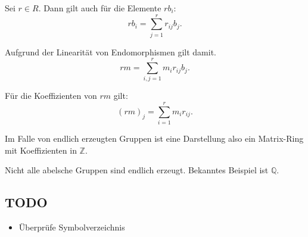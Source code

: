 \documentclass[a4paper]{amsart}
\theoremstyle{definition}
\newcommand{\Q}{\ensuremath{\mathbb{ Q }}}
\newcommand{\Z}{\ensuremath{\mathbb{ Z }}}
\begin{document}
Sei $r \in R$.
Dann gilt auch für die Elemente $rb_i$:
\begin{equation}
   rb_i = \sum_{j=1}^r r_{ij} b_j.
\end{equation} 

Aufgrund der Linearität von Endomorphismen gilt damit.
\begin{equation}
   rm = \sum_{i,j=1}^r m_i r_{ij} b_j.
\end{equation} 

Für die Koeffizienten von $rm$ gilt:
\begin{equation}
   (rm)_j = \sum_{i=1}^r m_i r_{ij}.
\end{equation} 

Im Falle von endlich erzeugten Gruppen ist eine Darstellung also ein Matrix-Ring mit Koeffizienten in $\Z$.

Nicht alle abelsche Gruppen sind endlich erzeugt. Bekanntes Beispiel ist $\Q$.


\subsection{}

\subsection{}

\subsection{}





\begin{backup}
\section{TODO}
\begin{itemize}
     \item Überprüfe Symbolverzeichnis
\end{itemize}


\end{backup}
\end{document}
